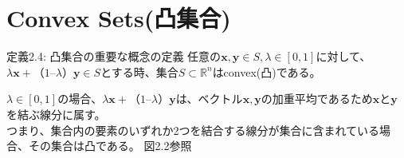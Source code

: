 \documentclass{jsarticle}
\begin{document}
\section*{Convex Sets(凸集合)}
\begin{itembox}[l]{定義2.4: 凸集合の重要な概念の定義}
任意の$\bm{x},\bm{y}\in S,\lambda \in [0,1]$に対して、$\lambda \bm{x} +（1 –\lambda）\bm{y}\in S$とする時、集合$S\subset \mathbb{R}^n$はconvex(凸)である。
\end{itembox}
$\lambda \in [0,1]$の場合、$\lambda\bm{x} +（1  – \lambda）\bm{y}$は、ベクトル$\bm{x,y}$の加重平均であるため$\bm{x}$と$\bm{y}$を結ぶ線分に属す。\\
つまり、集合内の要素のいずれか2つを結合する線分が集合に含まれている場合、その集合は凸である。 図2.2参照\\
\end{document}
